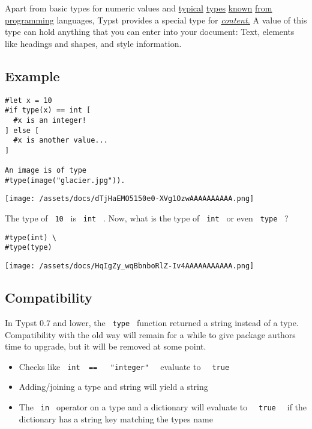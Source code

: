 Apart from basic types for numeric values and
\href{/docs/reference/foundations/int/}{typical}
\href{/docs/reference/foundations/float/}{types}
\href{/docs/reference/foundations/str/}{known}
\href{/docs/reference/foundations/array/}{from}
\href{/docs/reference/foundations/dictionary/}{programming} languages,
Typst provides a special type for
\href{/docs/reference/foundations/content/}{\emph{content.}} A value of
this type can hold anything that you can enter into your document: Text,
elements like headings and shapes, and style information.

\subsection{Example}\label{example}

\begin{verbatim}
#let x = 10
#if type(x) == int [
  #x is an integer!
] else [
  #x is another value...
]

An image is of type
#type(image("glacier.jpg")).
\end{verbatim}

\texttt{[image: /assets/docs/dTjHaEMO5150e0-XVg1OzwAAAAAAAAAA.png]}

The type of \texttt{\ 10\ } is \texttt{\ int\ } . Now, what is the type
of \texttt{\ int\ } or even \texttt{\ type\ } ?

\begin{verbatim}
#type(int) \
#type(type)
\end{verbatim}

\texttt{[image: /assets/docs/HqIgZy\_wqBbnboRlZ-Iv4AAAAAAAAAAA.png]}

\subsection{Compatibility}\label{compatibility}

In Typst 0.7 and lower, the \texttt{\ type\ } function returned a string
instead of a type. Compatibility with the old way will remain for a
while to give package authors time to upgrade, but it will be removed at
some point.

\begin{itemize}
\tightlist
\item
  Checks like
  \texttt{\ int\ }{\texttt{\ ==\ }}\texttt{\ }{\texttt{\ "integer"\ }}\texttt{\ }
  evaluate to \texttt{\ }{\texttt{\ true\ }}\texttt{\ }
\item
  Adding/joining a type and string will yield a string
\item
  The \texttt{\ in\ } operator on a type and a dictionary will evaluate
  to \texttt{\ }{\texttt{\ true\ }}\texttt{\ } if the dictionary has a
  string key matching the type\textquotesingle s name
\end{itemize}

